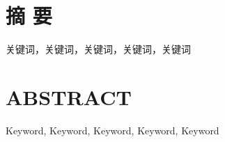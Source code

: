 
\chapter*{\songti{}\textbf{摘 \qquad 要}}
\thispagestyle{noheader}

\zhlipsum[1-4] 

\bigskip

关键词，关键词，关键词，关键词，关键词


\chapter*{\songti{}\textbf{ABSTRACT}}
\thispagestyle{noheader}

\lipsum[1-5] 

\bigskip

Keyword, Keyword, Keyword, Keyword, Keyword

